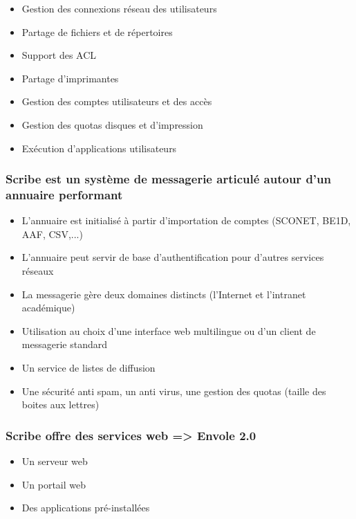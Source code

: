 \begin{itemize}
  \item Gestion des connexions réseau des utilisateurs
  \item Partage de fichiers et de répertoires
  \item Support des ACL
  \item Partage d'imprimantes
  \item Gestion des comptes utilisateurs et des accès
  \item Gestion des quotas disques et d'impression
  \item Exécution d'applications utilisateurs
\end{itemize}

\subsubsection{Scribe est un système de messagerie articulé autour d'un 
               annuaire performant}

\begin{itemize}
  \item L'annuaire est initialisé à partir d'importation de comptes 
        (SCONET, BE1D, AAF, CSV,...)
  \item L'annuaire peut servir de base d'authentification pour d'autres 
        services réseaux
  \item La messagerie gère deux domaines distincts (l'Internet et 
        l'intranet académique)
  \item Utilisation au choix d'une interface web multilingue ou d'un 
        client de messagerie standard
  \item Un service de listes de diffusion
  \item Une sécurité anti spam, un anti virus, une gestion des quotas 
        (taille des boites aux lettres)
\end{itemize}

\subsubsection{Scribe offre des services web => Envole 2.0}

\begin{itemize}
  \item Un serveur web
  \item Un portail web
  \item Des applications pré-installées
\end{itemize}

